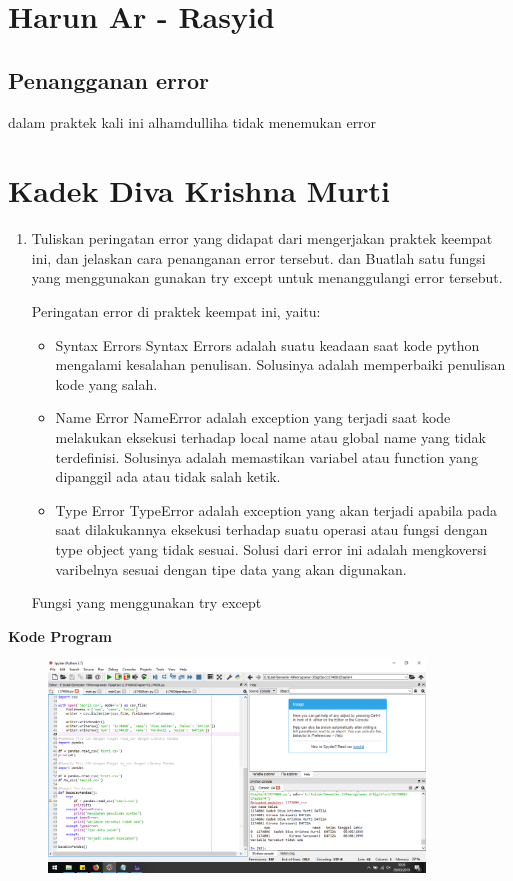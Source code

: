 \section{Harun Ar - Rasyid}
\subsection{Penangganan error}
dalam praktek kali ini alhamdulliha tidak menemukan error


\section{Kadek Diva Krishna Murti}
\begin{enumerate}
	\item Tuliskan  peringatan  error  yang  didapat  dari  mengerjakan  praktek  keempat  ini, dan  jelaskan  cara  penanganan  error  tersebut.   dan  Buatlah  satu  fungsi  yang menggunakan gunakan try except untuk menanggulangi error tersebut.
	
	Peringatan error di praktek keempat ini, yaitu:
	\begin{itemize}
		\item Syntax Errors
		Syntax Errors adalah suatu keadaan saat kode python mengalami kesalahan penulisan. Solusinya adalah memperbaiki penulisan kode yang salah.
		
		\item Name Error
		NameError adalah exception yang terjadi saat kode melakukan eksekusi terhadap local name atau global name yang tidak terdefinisi. Solusinya adalah memastikan variabel atau function yang dipanggil ada atau tidak salah ketik.
		
		\item Type Error
		TypeError adalah exception yang akan terjadi apabila pada saat dilakukannya eksekusi terhadap suatu operasi atau fungsi dengan type object yang tidak sesuai. Solusi dari error ini adalah mengkoversi varibelnya sesuai dengan tipe data yang akan digunakan.
	\end{itemize}
	
	Fungsi yang menggunakan try except
	
\end{enumerate}

\textbf{Kode Program}
\begin{figure}[H]
	\includegraphics[width=10cm]{figures/diva/Chapter4/harikedua/p1.png}
	\centering
\end{figure}

